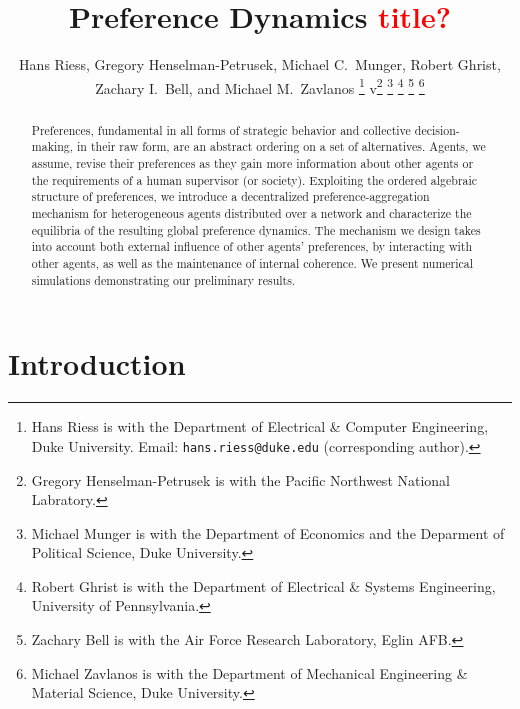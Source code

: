 \documentclass[conference]{ieeeconf}
\begin{document}
\title{\bf Preference Dynamics \textcolor{red}{title?}}

\author{Hans Riess, Gregory Henselman-Petrusek, Michael C.~Munger, Robert Ghrist, Zachary I.~Bell, and Michael M.~Zavlanos%
\thanks{Hans Riess is with the Department of Electrical \& Computer Engineering, Duke University. Email: {\tt hans.riess@duke.edu} (corresponding author).}%
v\thanks{Gregory Henselman-Petrusek is with the Pacific Northwest National Labratory.}%
\thanks{Michael Munger is with the Department of Economics and the Deparment of Political Science, Duke University.}%
\thanks{Robert Ghrist is with the Department of Electrical \& Systems Engineering, University of Pennsylvania.}%
\thanks{Zachary Bell is with the Air Force Research Laboratory, Eglin AFB.}%
\thanks{Michael Zavlanos is with the Department of Mechanical Engineering \& Material Science, Duke University.}%
}
\maketitle

\begin{abstract}
Preferences, fundamental in all forms of strategic behavior and collective decision-making, in their raw form, are an abstract ordering on a set of alternatives. Agents, we assume, revise their preferences as they gain more information about other agents or the requirements of a human supervisor (or society). Exploiting the ordered algebraic structure of preferences,  we introduce a decentralized preference-aggregation mechanism for heterogeneous agents distributed over a network and characterize the equilibria of the resulting global preference dynamics. The mechanism we design takes into account both external influence of other agents' preferences, by interacting with other agents, as well as the maintenance of internal coherence. We present numerical simulations demonstrating our preliminary results.
\end{abstract}


\section{Introduction}
\end{document}
